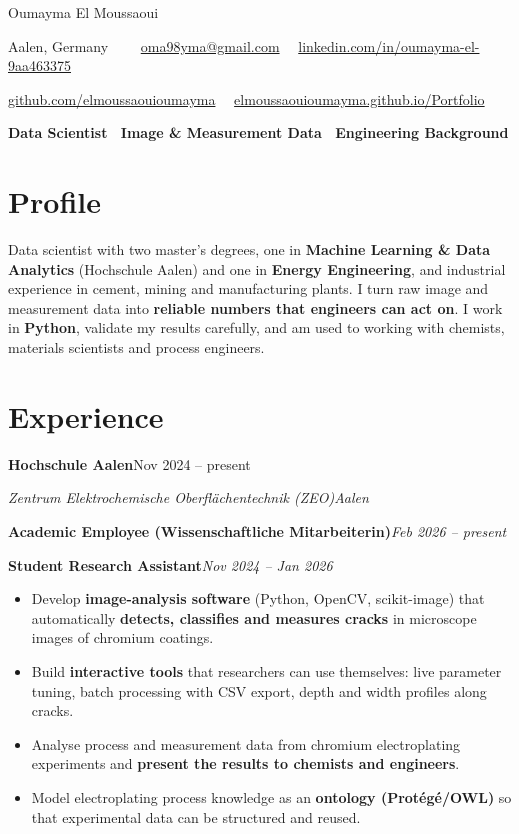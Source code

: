 \documentclass[10pt,a4paper]{article}
\newcommand{\org}[4]{%
  \par\vspace{4pt}\noindent\textbf{#1}\hfill #2\par
  \noindent\textit{#3}\hfill\textit{#4}\par}
\newcommand{\role}[2]{\par\vspace{1pt}\noindent\textbf{#1}\hfill\textit{#2}\par}
\newcommand{\sep}{\ \textbar\ }
\begin{document}
\begin{center}
  {\fontsize{24}{28}\selectfont Oumayma El Moussaoui}\par\vspace{4pt}
  {\small
  Aalen, Germany\sep \ifx\cvphone\empty\else\cvphone\sep\fi
  \href{mailto:oma98yma@gmail.com}{oma98yma@gmail.com}\sep
  \href{https://www.linkedin.com/in/oumayma-el-9aa463375}{linkedin.com/in/oumayma-el-9aa463375}\par
  \href{https://github.com/elmoussaouioumayma}{github.com/elmoussaouioumayma}\sep
  \href{https://elmoussaouioumayma.github.io/Portfolio/}{elmoussaouioumayma.github.io/Portfolio}\par}
  \vspace{4pt}
  \textbf{Data Scientist \textbar\ Image \& Measurement Data \textbar\ Engineering Background}\par
\end{center}
\vspace{-6pt}

\section{Profile}
Data scientist with two master's degrees, one in \textbf{Machine Learning \& Data Analytics} (Hochschule Aalen) and one in \textbf{Energy Engineering}, and industrial experience in cement, mining and manufacturing plants. I turn raw image and measurement data into \textbf{reliable numbers that engineers can act on}. I work in \textbf{Python}, validate my results carefully, and am used to working with chemists, materials scientists and process engineers.

\section{Experience}
\org{Hochschule Aalen}{Nov 2024 -- present}{Zentrum Elektrochemische Oberflächentechnik (ZEO)}{Aalen}
\role{Academic Employee (Wissenschaftliche Mitarbeiterin)}{Feb 2026 -- present}
\role{Student Research Assistant}{Nov 2024 -- Jan 2026}
\begin{itemize}
  \item Develop \textbf{image-analysis software} (Python, OpenCV, scikit-image) that automatically \textbf{detects, classifies and measures cracks} in microscope images of chromium coatings.
  \item Build \textbf{interactive tools} that researchers can use themselves: live parameter tuning, batch processing with CSV export, depth and width profiles along cracks.
  \item Analyse process and measurement data from chromium electroplating experiments and \textbf{present the results to chemists and engineers}.
  \item Model electroplating process knowledge as an \textbf{ontology (Protégé/OWL)} so that experimental data can be structured and reused.
\end{itemize}
\end{document}
